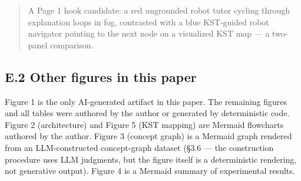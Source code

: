 \documentclass[
]{article}
\begin{document}
\begin{quote}
A Page 1 hook candidate: a red ungrounded robot tutor cycling through explanation loops in fog, contrasted with a blue KST-guided robot navigator pointing to the next node on a visualized KST map --- a two-panel comparison.
\end{quote}

\subsection{E.2 Other figures in this paper}\label{e2-other-figures-in-this-paper}

Figure 1 is the only AI-generated artifact in this paper. The remaining figures and all tables were authored by the author or generated by deterministic code. Figure 2 (architecture) and Figure 5 (KST mapping) are Mermaid flowcharts authored by the author. Figure 3 (concept graph) is a Mermaid graph rendered from an LLM-constructed concept-graph dataset (§3.6 --- the construction procedure uses LLM judgments, but the figure itself is a deterministic rendering, not generative output). Figure 4 is a Mermaid summary of experimental results.
\end{document}
